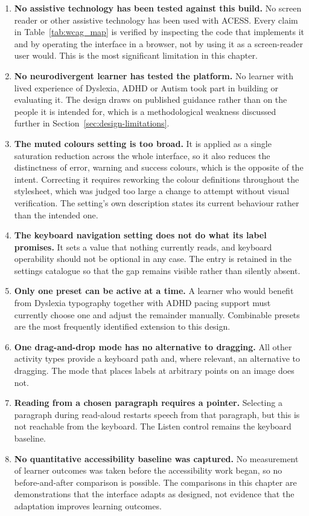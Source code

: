 \documentclass[12pt, oneside]{article} %
\begin{document}
\begin{enumerate}
    \item \textbf{No assistive technology has been tested against this build.} No screen reader or other assistive technology has been used with ACESS. Every claim in Table~\ref{tab:wcag_map} is verified by inspecting the code that implements it and by operating the interface in a browser, not by using it as a screen-reader user would. This is the most significant limitation in this chapter.
    \item \textbf{No neurodivergent learner has tested the platform.} No learner with lived experience of Dyslexia, ADHD or Autism took part in building or evaluating it. The design draws on published guidance rather than on the people it is intended for, which is a methodological weakness discussed further in Section~\ref{sec:design-limitations}.
    \item \textbf{The muted colours setting is too broad.} It is applied as a single saturation reduction across the whole interface, so it also reduces the distinctness of error, warning and success colours, which is the opposite of the intent. Correcting it requires reworking the colour definitions throughout the stylesheet, which was judged too large a change to attempt without visual verification. The setting's own description states its current behaviour rather than the intended one.
    \item \textbf{The keyboard navigation setting does not do what its label promises.} It sets a value that nothing currently reads, and keyboard operability should not be optional in any case. The entry is retained in the settings catalogue so that the gap remains visible rather than silently absent.
    \item \textbf{Only one preset can be active at a time.} A learner who would benefit from Dyslexia typography together with ADHD pacing support must currently choose one and adjust the remainder manually. Combinable presets are the most frequently identified extension to this design.
    \item \textbf{One drag-and-drop mode has no alternative to dragging.} All other activity types provide a keyboard path and, where relevant, an alternative to dragging. The mode that places labels at arbitrary points on an image does not.
    \item \textbf{Reading from a chosen paragraph requires a pointer.} Selecting a paragraph during read-aloud restarts speech from that paragraph, but this is not reachable from the keyboard. The Listen control remains the keyboard baseline.
    \item \textbf{No quantitative accessibility baseline was captured.} No measurement of learner outcomes was taken before the accessibility work began, so no before-and-after comparison is possible. The comparisons in this chapter are demonstrations that the interface adapts as designed, not evidence that the adaptation improves learning outcomes.
\end{enumerate}
\end{document}
